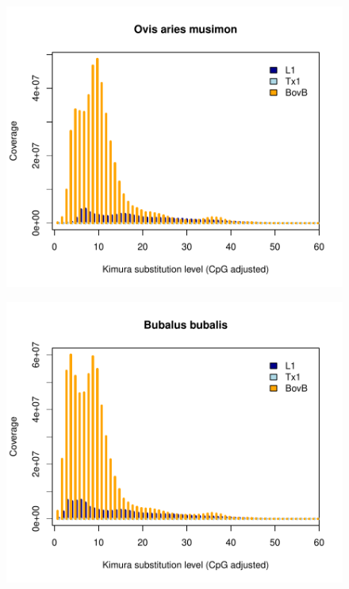 \documentclass[12pt,a4paper,times]{article}
\begin{document}
\begin{figure}[H]
	\centering
	\includegraphics[scale=0.8]{suppFigures/divergencePlots/Ovis_aries_musimon.pdf}
	\caption{\label{OvisM}}
\end{figure}

\begin{figure}[H]
	\centering
	\includegraphics[scale=0.8]{suppFigures/divergencePlots/Bubalus_bubalis.pdf}
	\caption{\label{Bubulus}}
\end{figure}
\end{document}

